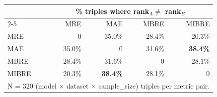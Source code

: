 \begin{tabular}{lrrrr}
\toprule
 & \multicolumn{4}{c}{\% triples where rank$_A \neq$ rank$_B$} \\
\cmidrule{2-5}
 & MRE & MAE & MBRE & MIBRE \\
\midrule
MRE & 0 & 35.0\% & 28.4\% & 20.3\% \\
MAE & 35.0\% & 0 & 31.6\% & \textbf{38.4\%} \\
MBRE & 28.4\% & 31.6\% & 0 & 28.1\% \\
MIBRE & 20.3\% & \textbf{38.4\%} & 28.1\% & 0 \\
\bottomrule
\multicolumn{5}{l}{\footnotesize N = 320 (model $\times$ dataset $\times$ sample\_size) triples per metric pair.}
\end{tabular}
